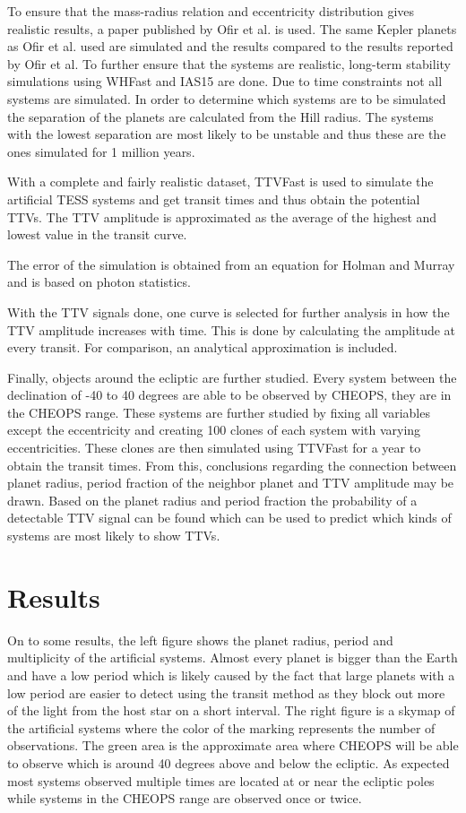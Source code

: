 \documentclass[12pt]{report}
\begin{document}
		
	
	
	To ensure that the mass-radius relation and eccentricity distribution gives realistic results, a paper published by Ofir et al. is used. The same Kepler planets as Ofir et al. used are simulated and the results compared to the results reported by Ofir et al. To further ensure that the systems are realistic, long-term stability simulations using WHFast and IAS15 are done. Due to time constraints not all systems are simulated. In order to determine which systems are to be simulated the separation of the planets are calculated from the Hill radius. The systems with the lowest separation are most likely to be unstable and thus these are the ones simulated for 1 million years.
	
	With a complete and fairly realistic dataset, TTVFast is used to simulate the artificial TESS systems and get transit times and thus obtain the potential TTVs. The TTV amplitude is approximated as the average of the highest and lowest value in the transit curve.
	
	The error of the simulation is obtained from an equation for Holman and Murray and is based on photon statistics. 
	
	With the TTV signals done, one curve is selected for further analysis in how the TTV amplitude increases with time. This is done by calculating the amplitude at every transit. For comparison, an analytical approximation is included.
	
	Finally, objects around the ecliptic are further studied. Every system between the declination of -40 to 40 degrees are able to be observed by CHEOPS, they are in the CHEOPS range. These systems are further studied by fixing all variables except the eccentricity and creating 100 clones of each system with varying eccentricities.  These clones are then simulated using TTVFast for a year to obtain the transit times. From this, conclusions regarding the connection between planet radius, period fraction of the neighbor planet and TTV amplitude may be drawn. Based on the planet radius and period fraction the probability of a detectable TTV signal can be found which can be used to predict which kinds of systems  are most likely to show TTVs.
	
\section*{Results}
	On to some results, the left figure shows the planet radius, period and multiplicity of the artificial systems. Almost every planet is bigger than the Earth and have a low period which is likely caused by the fact that large planets with a low period are easier to detect using the transit method as they block out more of the light from the host star on a short interval. The right figure is a skymap of the artificial systems where the color of the marking represents the number of observations. The green area is the approximate area where CHEOPS will be able to observe which is around 40 degrees above and below the ecliptic. As expected most systems observed multiple times are located at or near the ecliptic poles while systems in the CHEOPS range are observed once or twice.
	
\end{document}
